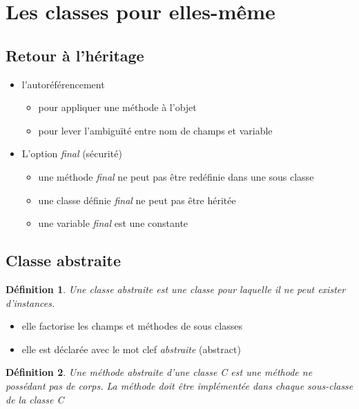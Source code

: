 \documentclass{article}
\newtheorem{definition}{Définition}
\begin{document}
\section{Les classes pour elles-même}

\subsection{Retour à l'héritage}

\begin{itemize}
	\item l'autoréférencement
	\begin{itemize}
		\item pour appliquer une méthode à l'objet
		\item pour lever l'ambiguïté entre nom de champs et variable
	\end{itemize}
	\item L'option \emph{final} (sécurité)
	\begin{itemize}
		\item une méthode \emph{final} ne peut pas être redéfinie dans une sous classe
		\item une classe définie \emph{final} ne peut pas être héritée
		\item une variable \emph{final} est une constante
	\end{itemize}
\end{itemize}

\subsection{Classe abstraite}

\begin{definition}
	Une classe abstraite est une classe pour laquelle il ne peut
exister d'instances.
\end{definition}

\begin{itemize}
	\item elle factorise les champs et méthodes de sous classes
	\item elle est déclarée avec le mot clef \emph{abstraite} (abstract)
\end{itemize}

\begin{definition}
	Une méthode abstraite d'une classe C est une méthode ne
possédant pas de corps. La méthode doit être implémentée dans chaque
sous-classe de la classe C
\end{definition}
\end{document}
